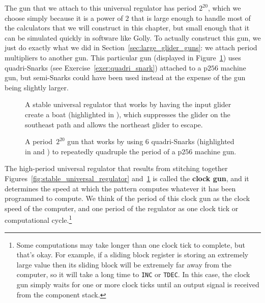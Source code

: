 The gun that we attach to this universal regulator has period $2^{20}$, which we choose simply because it is a power of $2$ that is large enough to handle most of the calculators that we will construct in this chapter, but small enough that it can be simulated quickly in software like Golly. To actually construct this gun, we just do exactly what we did in Section~\ref{sec:large_glider_guns}: we attach period multipliers to another gun. This particular gun (displayed in Figure~\ref{fig:p2to_the_20_gun}) uses quadri-Snarks (see Exercise~\ref{exer:quadri_snark})  attached to a p$256$ machine gun, but semi-Snarks could have been used instead at the expense of the gun being slightly larger.

\begin{figure}[!htb]
	\centering
	\begin{minipage}[t]{0.47\textwidth}
		\centering
		\caption{A stable universal regulator that works by having the input glider create a boat (highlighted in ), which suppresses the glider on the southeast path and allows the northeast glider to escape.}\label{fig:stable_universal_regulator}
	\end{minipage}\hfill
	\begin{minipage}[t]{0.49\textwidth}
		\centering
		\caption{A period~$2^{20}$ gun that works by using $6$ quadri-Snarks (highlighted in  and ) to repeatedly quadruple the period of a p$256$ machine gun.}\label{fig:p2to_the_20_gun}
	\end{minipage}
\end{figure}

The high-period universal regulator that results from stitching together Figures~\ref{fig:stable_universal_regulator} and~\ref{fig:p2to_the_20_gun} is called the \textbf{clock gun}, and it determines the speed at which the pattern computes whatever it has been programmed to compute. We think of the period of this clock gun as the clock speed of the computer, and one period of the regulator as one clock tick or computational cycle.\footnote{Some computations may take longer than one clock tick to complete, but that's okay. For example, if a sliding block register is storing an extremely large value then its sliding block will be extremely far away from the computer, so it will take a long time to \texttt{INC} or \texttt{TDEC}. In this case, the clock gun simply waits for one or more clock ticks until an output signal is received from the component stack.}

